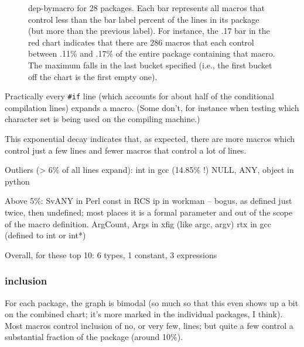 \documentclass[10pt]{article}
\begin{document}
\begin{figure}
\centerline{}
\bigskip
\centerline{}
\caption{dep-bymacro for 28 packages.
  Each bar represents all macros that control less than the bar label
  percent of the lines in its package (but more than the previous label).
  For instance, the .17 bar in the red chart indicates that there are 286
  macros that each control between .11\% and .17\% of the entire package
  containing that macro.  The maximum falls in the last bucket specified
  (i.e., the first bucket off the chart is the first empty one).}
\label{fig:dep-bymacro}
\end{figure}

Practically every {\tt \#if} line (which accounts for about half of the
conditional compilation lines) expands a macro.  (Some don't, for instance
when testing which character set is being used on the compiling machine.)

        This exponential decay indicates that, as expected, there are more
          macros which control just a few lines and fewer macros that
          control a lot of lines.

        Outliers (> 6\% of all lines expand):
          int in gcc (14.85\% !)
          NULL, ANY, object in python

        Above 5\%: 
          SvANY in Perl
          const in RCS
          ip in workman -- bogus, as defined just twice, then undefined;
                  most places it is a formal parameter and out of the scope
                  of the macro definition.
          ArgCount, Args in xfig (like argc, argv)
          rtx in gcc (defined to int or int*)

        Overall, for these top 10:  6 types, 1 constant, 3 expressions

   \subsubsection{inclusion}

        For each package, the graph is bimodal (so much so that this even
          shows up a bit on the combined chart; it's more marked in the
          individual packages, I think).  Most macros control inclusion of
          no, or very few, lines; but quite a few control a substantial
          fraction of the package (around 10\%).
\end{document}
